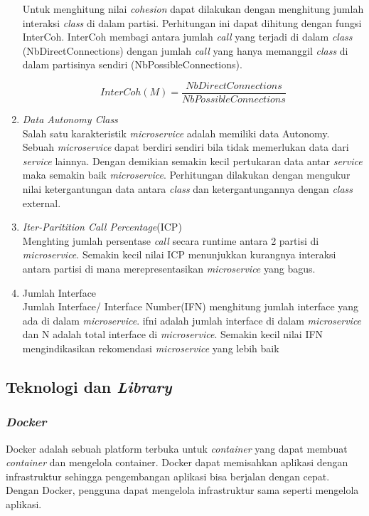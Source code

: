 \begin{enumerate}[leftmargin=1.3cm]
	Untuk menghitung nilai \textit{cohesion} dapat dilakukan dengan menghitung jumlah interaksi \textit{class} di dalam partisi. Perhitungan ini dapat dihitung dengan fungsi InterCoh. InterCoh membagi antara jumlah \textit{call} yang terjadi di dalam \textit{class} (NbDirectConnections) dengan jumlah \textit{call} yang hanya memanggil \textit{class} di dalam partisinya sendiri (NbPossibleConnections).
	
	\begin{equation}
		I n t e r C o h(M)=\frac{N b D i r e c t C o n n e c t i o n s}{N b P o s s i b l e C o n n e c t i o n s}
		\label{eq:interCoh}
	\end{equation}
	
	\item \textit{Data Autonomy Class} \cite{5B1}\\
	Salah satu karakteristik \textit{microservice} adalah memiliki data Autonomy. Sebuah \textit{microservice} dapat berdiri sendiri bila tidak memerlukan data dari \textit{service} lainnya. Dengan demikian semakin kecil pertukaran data antar \textit{service} maka semakin baik \textit{microservice}. Perhitungan dilakukan dengan mengukur nilai ketergantungan data antara \textit{class} dan ketergantungannya dengan \textit{class} external.
	
	\item \textit{Iter-Paritition Call Percentage}(ICP) \cite{ECD} \\
	Menghting jumlah persentase \textit{call} secara runtime antara 2 partisi di \textit{microservice}. Semakin kecil nilai ICP menunjukkan kurangnya interaksi antara partisi di mana merepresentasikan \textit{microservice} yang bagus.	
	
	\item Jumlah Interface \cite{ECD} \\
	Jumlah Interface/ Interface Number(IFN) menghitung jumlah interface yang ada di dalam \textit{microservice}. ifni adalah jumlah interface di dalam \textit{microservice} dan N adalah total interface di \textit{microservice}. Semakin kecil nilai IFN mengindikasikan rekomendasi \textit{microservice} yang lebih baik\\


\end{enumerate}	

\subsection{Teknologi dan \textit{Library}}
\subsubsection{\textit{Docker} \cite{docker}}
Docker adalah sebuah platform terbuka untuk \textit{container} yang dapat membuat \textit{container} dan mengelola container. Docker dapat memisahkan aplikasi dengan infrastruktur sehingga pengembangan aplikasi bisa berjalan dengan cepat. Dengan Docker, pengguna dapat mengelola infrastruktur sama seperti mengelola aplikasi.

